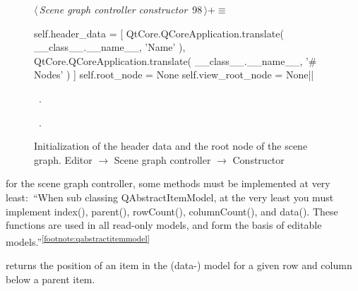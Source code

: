 \documentclass[%
    a4paper,    %
    justified,  %
    nobib,      %
    openany     %
]{tufte-book}
\makeatletter
\renewcommand{\label}[1]{\@tufte@label{##1}}%
\newcommand{\footref}[1]{\textsuperscript{\ref{#1}}}
\makeatother
\begin{document}
\begin{figure}
\begin{flushleft} \small
\begin{minipage}{\linewidth}\label{scrap29}\raggedright\small
{} $\langle\,${\itshape Scene graph controller constructor}\nobreak\ {\footnotesize {98}}$\,\rangle+\equiv$
\vspace{-1ex}
\begin{pythoncode}
    self.header_data = [
        QtCore.QCoreApplication.translate(
            __class__.__name__, 'Name'
        ),
        QtCore.QCoreApplication.translate(
            __class__.__name__, '# Nodes'
        )
    ]
    self.root_node = None
    self.view_root_node = None|\NWsep|
\end{pythoncode}
\vspace{1.5ex}
\footnotesize
\begin{list}{}{\setlength{\itemsep}{-\parsep}\setlength{\itemindent}{-\leftmargin}}
\item \NWtxtMacroDefBy\ .
\item \NWtxtMacroRefIn\ .

\item{}
\end{list}
\end{minipage}\vspace{4ex}
\end{flushleft}
\caption{Initialization of the header data and the root node of the scene graph.
  \newline{}\newline{}Editor $\rightarrow$ Scene graph controller $\rightarrow$
  Constructor}
\end{figure}

 for the scene graph
controller, some methods must be implemented at very least:~\enquote{When
sub classing QAbstractItemModel, at the very least you must implement index(),
parent(), rowCount(), columnCount(), and data(). These functions are used in all
read-only models, and form the basis of editable
models.}\footref{footnote:qabstractitemmodel}

 returns the position of an item in the (data-)
model for a given row and column below a parent item.
\end{document}
